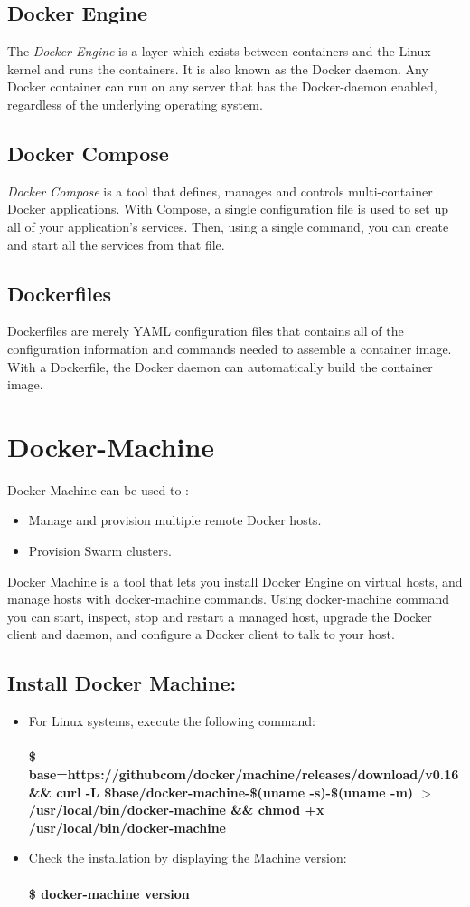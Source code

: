 \documentclass[12pt]{report}
\begin{document}
\subsection{Docker Engine}
The \textit{Docker Engine} is a layer which exists between containers and the Linux kernel and runs the containers. It is also known as the Docker daemon. Any Docker container can run on any server that has the Docker-daemon enabled, regardless of the underlying operating system.
\subsection{Docker Compose}
\textit{Docker Compose} is a tool that defines, manages and controls multi-container Docker applications. With Compose, a single configuration file is used to set up all of your application’s services. Then, using a single command, you can create and start all the services from that file.
\subsection{Dockerfiles}
Dockerfiles are merely YAML configuration files that contains all of the configuration information and commands needed to assemble a container image. With a Dockerfile, the Docker daemon can automatically build the container image.
\section{Docker-Machine}
Docker Machine can be used to :
\begin{itemize}
	\item Manage and provision multiple remote Docker hosts.
	\item Provision Swarm clusters.
\end{itemize}
Docker Machine is a tool that lets you install Docker Engine on virtual hosts, and manage hosts with docker-machine commands. Using docker-machine command you can start, inspect, stop and restart a managed host, upgrade the Docker client and daemon, and configure a Docker client to talk to your host.
\subsection{Install Docker Machine:}
\begin{itemize}
	\item For Linux systems, execute the following command:\\\\
	\textbf{\$ base=https://githubcom/docker/machine/releases/download/v0.16 \&\& curl -L \$base/docker-machine-\$(uname -s)-\$(uname -m) $>$/usr/local/bin/docker-machine \&\& chmod +x /usr/local/bin/docker-machine}
	\item Check the installation by displaying the Machine version:\\\\
	\textbf{\$ docker-machine version}
\end{itemize}
\end{document}
